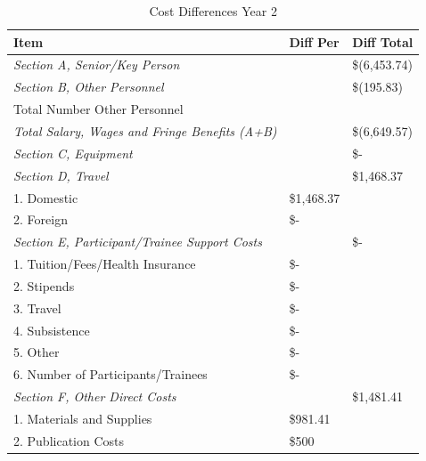 \documentclass[12pt]{article}
\newcommand{\yr}{2}
\begin{document}
\begin{table}[h!]
\begin{center}
\caption{Cost Differences Year \yr}
\begin{tabular}{ | l | l | l | }
\hline
	\textbf{Item} & \textbf{Diff Per} & \textbf{Diff Total} \\ \hline
	\textit{Section A, Senior/Key Person} &  & \$(6,453.74) \\ \hline
	\textit{Section B, Other Personnel} &  & \$(195.83)  \\ \hline
	\hspace*{1 em}Total Number Other Personnel &  & \  \\ \hline
	\textit{Total Salary, Wages and Fringe Benefits (A+B)} &  & \$(6,649.57)  \\ \hline
	\textit{Section C, Equipment} &  &  \$-    \\ \hline
	\textit{Section D, Travel} &  & \$1,468.37 \\ \hline
	\hspace*{1 em}1.  Domestic & \$1,468.37 & \  \\ \hline
	\hspace*{1 em}2.  Foreign &  \$-    & \  \\ \hline
	\textit{Section E, Participant/Trainee Support Costs} & \ &  \$-      \\ \hline
	\hspace*{1 em}1.  Tuition/Fees/Health Insurance &  \$-    & \  \\ \hline
	\hspace*{1 em}2.  Stipends &  \$-    & \  \\ \hline
	\hspace*{1 em}3.  Travel &  \$-    & \  \\ \hline
	\hspace*{1 em}4.  Subsistence &  \$-    & \  \\ \hline
	\hspace*{1 em}5.  Other &  \$-    & \  \\ \hline
	\hspace*{1 em}6.  Number of Participants/Trainees &  \$-    & \  \\ \hline
	\textit{Section F, Other Direct Costs} &  & \$1,481.41 \\ \hline
	\hspace*{1 em}1.  Materials and Supplies & \$981.41 & \  \\ \hline
	\hspace*{1 em}2.  Publication Costs & \$500 & \  \\ \hline

\end{tabular}
\end{center}
\end{table}
\end{document}
